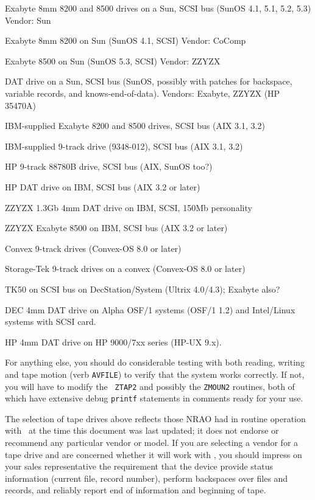\item\bul Exabyte 8mm 8200 and 8500 drives on a Sun, SCSI bus
                 (SunOS 4.1, 5.1, 5.2, 5.3) Vendor: Sun
\item\bul Exabyte 8mm 8200 on Sun (SunOS 4.1, SCSI) Vendor: CoComp
\item\bul Exabyte 8500 on Sun (SunOS 5.3, SCSI) Vendor: ZZYZX
\item\bul 4mm DAT drive on a Sun, SCSI bus (SunOS,
                 possibly with patches for backspace, variable records, and
                 knows-end-of-data).  Vendors: Exabyte, ZZYZX (HP 35470A)
\medskip
\item\bul IBM-supplied Exabyte 8200 and 8500 drives, SCSI bus
                 (AIX 3.1, 3.2)
\item\bul IBM-supplied 9-track drive (9348-012), SCSI bus (AIX 3.1, 3.2)
\item\bul HP 9-track 88780B drive, SCSI bus (AIX, SunOS too?)
\item\bul HP DAT drive on IBM, SCSI bus (AIX 3.2 or later)
\item\bul ZZYZX 1.3Gb 4mm DAT drive on IBM, SCSI, 150Mb personality
\item\bul ZZYZX Exabyte 8500 on IBM, SCSI bus (AIX 3.2 or later)
\medskip
\item\bul Convex 9-track drives (Convex-OS 8.0 or later)
\item\bul Storage-Tek 9-track drives on a convex (Convex-OS 8.0 or later)
\medskip
\item\bul TK50 on SCSI bus on DecStation/System (Ultrix 4.0/4.3);
                 Exabyte also?
\item\bul DEC 4mm DAT drive on Alpha OSF/1 systems (OSF/1 1.2) and
                 Intel/Linux systems with SCSI card.
\medskip
\item\bul HP 4mm DAT drive on HP 9000/7xx series (HP-UX 9.x).
\medskip

\noindent For anything else, you should do considerable testing with
both reading, writing and tape motion (verb {\tt AVFILE}) to verify that
the system works correctly.  If not, you will have to modify the {\tt
ZTAP2} and possibly the {\tt ZMOUN2} routines, both of which have
extensive debug {\tt printf} statements in comments ready for your use.

The selection of tape drives above reflects those NRAO had in routine
operation with \ttaips\ at the time this document was last updated; it
does not endorse or recommend any particular vendor or model.  If you are
selecting a vendor for a tape drive and are concerned whether it will work
with \AIPS, you should impress on your sales representative the
requirement that the device provide status information (current file,
record number), perform backspaces over files and records, and reliably
report end of information and beginning of tape.

